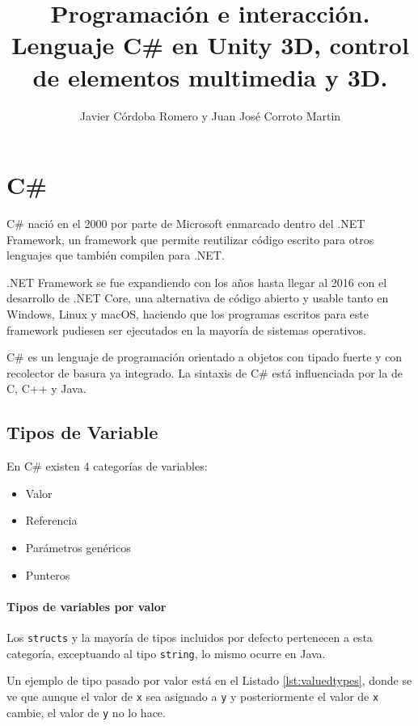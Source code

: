 \documentclass{pre-tfg}
\title{Programación e interacción. Lenguaje C\# en Unity 3D, control de elementos multimedia y 3D.}
\author{Javier Córdoba Romero y Juan José Corroto Martin}
\begin{document}
\maketitle
\tableofcontents

\newpage
\section{C\#}

C\# nació en el 2000 por parte de Microsoft enmarcado dentro del .NET Framework, un framework que permite reutilizar código escrito para otros lenguajes que también compilen para .NET.

.NET Framework se fue expandiendo con los años hasta llegar al 2016 con el desarrollo de .NET Core, una alternativa de código abierto y usable tanto en Windows, Linux y macOS, haciendo que los programas escritos para este framework pudiesen ser ejecutados en la mayoría de sistemas operativos.

C\# es un lenguaje de programación orientado a objetos con tipado fuerte y con recolector de basura ya integrado. La sintaxis de C\# está influenciada por la de C, C++ y Java.

\subsection{Tipos de Variable}

En C\# existen 4 categorías de variables:

\begin{itemize}
	\item Valor
	\item Referencia
	\item Parámetros genéricos
	\item Punteros
\end{itemize}

\paragraph{Tipos de variables por valor}

Los \texttt{structs} y la mayoría de tipos incluidos por defecto pertenecen a esta categoría, exceptuando al tipo \texttt{string}, lo mismo ocurre en Java.

Un ejemplo de tipo pasado por valor está en el Listado \ref{lst:valuedtypes}, donde se ve que aunque el valor de \texttt{x} sea asignado a \texttt{y} y posteriormente el valor de \texttt{x} cambie, el valor de \texttt{y} no lo hace.
\end{document}
